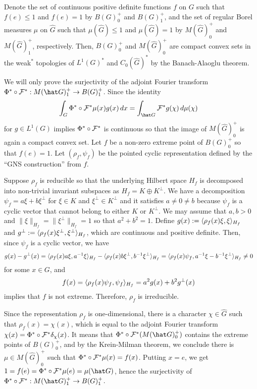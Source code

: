 \documentclass[a4paper]{article}
\begin{document}
\begin{pf}
Denote the set of continuous positive definite functions $f$ on $G$ such that $f(e)\le1$ and $f(e)=1$ by $B(G)_0^+$ and $B(G)_1^+$, and the set of regular Borel measures $\mu$ on $\hat G$ such that $\mu(\hat G)\le1$ and $\mu(\hat G)=1$ by $M(\hat G)_0^+$ and $M(\hat G)_1^+$, respectively.
Then, $B(G)_0^+$ and $M(\hat G)_0^+$ are compact convex sets in the weak$^*$ topologies of $L^1(G)^*$ and $C_0(\hat G)^*$ by the Banach-Alaoglu theorem.

We will only prove the surjectivity of the adjoint Fourier transform $\Phi^*\circ\cF^*:M(\hat G)_1^+\to B(G)_1^+$.
Since the identity
\[\int_G\Phi^*\circ\cF^*\mu(x)g(x)\,dx=\int_{\hat G}\cF^*g(\chi)\,d\mu(\chi)\]
for $g\in L^1(G)$ implies $\Phi^*\circ\mathcal{F}^*$ is continuous so that the image of $M(\hat G)_0^+$ is again a compact convex set.
Let $f$ be a non-zero extreme point of $B(G)_0^+$ so that $f(e)=1$.
Let $(\rho_f,\psi_f)$ be the pointed cyclic representation defined by the ``GNS construction'' from $f$.

Suppose $\rho_f$ is reducible so that the underlying Hilbert space $H_f$ is decomposed into non-trivial invariant subspaces as $H_f=K\oplus K^\perp$.
We have a decomposition $\psi_f=a\xi+b\xi^\perp$ for $\xi\in K$ and $\xi^\perp\in K^\perp$ and it satisfies $a\ne0\ne b$ because $\psi_f$ is a cyclic vector that cannot belong to either $K$ or $K^\perp$.
We may assume that $a,b>0$ and $\|\xi\|_{H_f}=\|\xi^\perp\|_{H_f}=1$ so that $a^2+b^2=1$.
Define $g(x):=\langle\rho_f(x)\xi,\xi\rangle_{H_f}$ and $g^\perp:=\langle\rho_f(x)\xi^\perp,\xi^\perp\rangle_{H_f}$, which are continuous and positive definite.
Then, since $\psi_f$ is a cyclic vector, we have
\[g(x)-g^\perp(x)=\langle\rho_f(x)a\xi,a^{-1}\xi\rangle_{H_f}-\langle\rho_f(x)b\xi^\perp,b^{-1}\xi^\perp\rangle_{H_f}=\langle\rho_f(x)\psi_f,a^{-1}\xi-b^{-1}\xi^\perp\rangle_{H_f}\ne0\]
for some $x\in G$, and
\[f(x)=\langle\rho_f(x)\psi_f,\psi_f\rangle_{H_f}=a^2g(x)+b^2g^\perp(x)\]
implies that $f$ is not extreme.
Therefore, $\rho_f$ is irreducible.

Since the representation $\rho_f$ is one-dimensional, there is a character $\chi\in\hat G$ such that $\rho_f(x)=\chi(x)$, which is equal to the adjoint Fourier transform $\chi(x)=\Phi^*\circ\mathcal{F}^*\delta_\chi(x)$.
It means that $\Phi^*\circ\cF^*(M(\hat G)_0^+)$ contains the extreme points of $B(G)_0^+$, and by the Krein-Milman theorem, we conclude there is $\mu\in M(\hat G)_0^+$ such that $\Phi^*\circ\mathcal{F}^*\mu(x)=f(x)$.
Putting $x=e$, we get $1=f(e)=\Phi^*\circ\cF^*\mu(e)=\mu(\hat G)$, hence the surjectivity of $\Phi^*\circ\cF^*:M(\hat G)_1^+\to B(G)_1^+$.
\end{pf}
\end{document}
